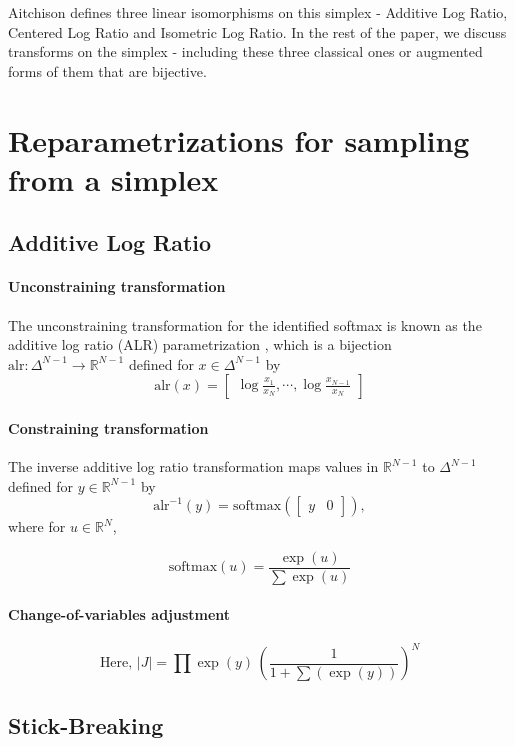 \documentclass[11pt]{article}
\newcommand{\abs}[1]{\left| #1 \right|}
\begin{document}
Aitchison defines three linear isomorphisms on this simplex - Additive Log Ratio, Centered Log Ratio and Isometric Log Ratio. In the rest of the paper, we discuss transforms on the simplex - including these three classical ones or augmented forms of them that are bijective.

\section{Reparametrizations for sampling from a simplex}

\subsection{Additive Log Ratio}
\paragraph{Unconstraining transformation}
The unconstraining transformation for the identified softmax is known as
the additive log ratio (ALR) parametrization
\cite{aitchison1982statistical}, which is a bijection
$\textrm{alr}:\Delta^{N-1} \rightarrow \mathbb{R}^{N-1}$ defined for
$x \in \Delta^{N-1}$ by
\[
  \textrm{alr}(x)
  = \begin{bmatrix}\displaystyle
    \log \frac{x_1}{x_N}, \cdots , \log \frac{x_{N-1}}{x_N}
  \end{bmatrix}
\]
\paragraph{Constraining transformation}
The inverse additive log ratio transformation maps values in
$\mathbb{R}^{N-1}$ to $\Delta^{N-1}$ defined for $y \in
\mathbb{R}^{N-1}$ by
\[
  \textrm{alr}^{-1}(y)
  = \textrm{softmax}(\begin{bmatrix} y &  0 \end{bmatrix}),
\]
where for $u \in \mathbb{R}^N$,

\[
  \textrm{softmax}(u) = \frac{\exp(u)}{\sum \exp(u)}
\]

\paragraph{Change-of-variables adjustment}
\[
\textrm{Here, } \abs{J} = \prod \exp(y)
  \, \left( \frac{1}{1 + \sum(\exp(y))} \right)^N
\]


\subsection{Stick-Breaking}
\end{document}

